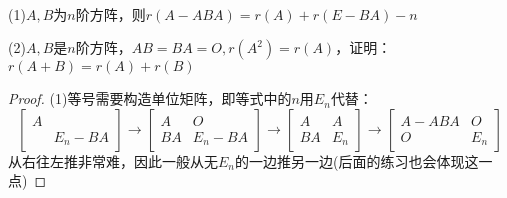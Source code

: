 ~

\begin{exercise}[秩不等式的推广]
  (1)$A,B$为$n$阶方阵，则$r(A - ABA) = r(A) + r(E - BA) - n$

  (2)$A,B$是$n$阶方阵，$AB = BA = O, r(A^2) = r(A)$，证明：$r(A + B) = r(A) + r(B)$
\end{exercise}

\begin{proof}
  (1)等号需要构造单位矩阵，即等式中的$n$用$E_n$代替：
  \begin{equation*}
    \left[
      \begin{array}{cc}
        A&\\
        &E_n - BA
      \end{array}
    \right] \rightarrow \left[
      \begin{array}{cc}
        A&O\\
        BA&E_n - BA
      \end{array}
    \right] \rightarrow \left[
      \begin{array}{cc}
        A&A\\
        BA&E_n
      \end{array}
    \right] \rightarrow \left[
      \begin{array}{cc}
        A - ABA&O \\
               O&E_n
      \end{array}
    \right]
  \end{equation*}
  从右往左推非常难，因此一般从无$E_n$的一边推另一边(后面的练习也会体现这一点)


\end{proof}
